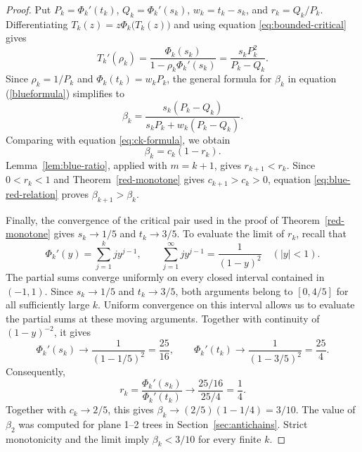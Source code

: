 \documentclass[10pt,a4paper]{amsart}
\theoremstyle{remark}
\begin{document}
\begin{proof}
Put $P_k=\Phi_k'(t_k)$, $Q_k=\Phi_k'(s_k)$, $w_k=t_k-s_k$,
and $r_k=Q_k/P_k$. Differentiating $T_k(z)=z\Phi_k\big(T_k(z)\big)$
and using equation \eqref{eq:bounded-critical} gives
\[
T_k'(\rho_k)
=\frac{\Phi_k(s_k)}{1-\rho_k\Phi_k'(s_k)}
=\frac{s_kP_k^2}{P_k-Q_k}.
\]
Since $\rho_k=1/P_k$ and $\Phi_k(t_k)=w_kP_k$, the general formula for $\beta_k$ in equation (\ref{blueformula})
simplifies to
\[
\beta_k=\frac{s_k(P_k-Q_k)}{s_kP_k+w_k(P_k-Q_k)}.
\]
Comparing with equation \eqref{eq:ck-formula}, we obtain
\begin{equation}\label{eq:blue-red-relation}
\beta_k=c_k(1-r_k).
\end{equation}
Lemma~\ref{lem:blue-ratio}, applied with $m=k+1$, gives
$r_{k+1}<r_k$. Since $0<r_k<1$ and
Theorem~\ref{red-monotone} gives $c_{k+1}>c_k>0$, equation
\eqref{eq:blue-red-relation} proves $\beta_{k+1}>\beta_k$.

Finally, the convergence of the critical pair used in the proof of
Theorem~\ref{red-monotone} gives $s_k\to1/5$ and $t_k\to3/5$.
To evaluate the limit of $r_k$, recall that
\[
\Phi_k'(y)=\sum_{j=1}^k jy^{j-1},
\qquad
\sum_{j=1}^{\infty}jy^{j-1}=\frac{1}{(1-y)^2}
\quad (|y|<1).
\]
The partial sums converge uniformly on every closed interval contained
in $(-1,1)$. Since $s_k\to1/5$ and $t_k\to3/5$, both arguments
belong to $[0,4/5]$ for all sufficiently large $k$. Uniform convergence
on this interval allows us to evaluate the partial sums at these moving
arguments. Together with continuity of $(1-y)^{-2}$, it gives
\[
\Phi_k'(s_k)\longrightarrow\frac{1}{(1-1/5)^2}=\frac{25}{16},
\qquad
\Phi_k'(t_k)\longrightarrow\frac{1}{(1-3/5)^2}=\frac{25}{4}.
\]
Consequently,
\[
r_k=\frac{\Phi_k'(s_k)}{\Phi_k'(t_k)}
\longrightarrow\frac{25/16}{25/4}=\frac14.
\]
Together with $c_k\to2/5$, this gives
$\beta_k\to(2/5)(1-1/4)=3/10$.
The value of $\beta_2$ was computed for plane 1--2 trees in
Section~\ref{sec:antichains}. Strict monotonicity and the limit imply
$\beta_k<3/10$ for every finite $k$.
\end{proof}
\end{document}

